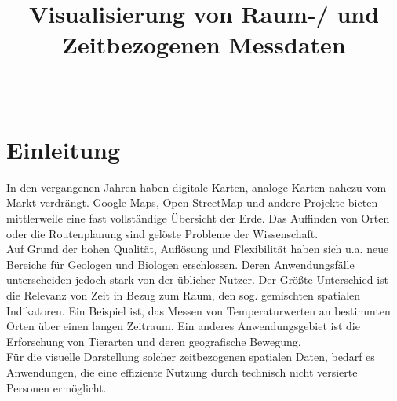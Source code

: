 \documentclass[10pt,conference,compsocconf]{IEEEtran}
\begin{document}
%
\title{\textbf{\Large Visualisierung von Raum-/ und Zeitbezogenen Messdaten}\\[0.2ex]}

\author{
\\
}

\maketitle

\IEEEpeerreviewmaketitle


\section{Einleitung}
In den vergangenen Jahren haben digitale Karten, analoge Karten nahezu vom Markt verdrängt. Google Maps, Open StreetMap und andere Projekte bieten mittlerweile eine fast vollständige Übersicht der Erde. Das Auffinden von Orten oder die Routenplanung sind gelöste Probleme der Wissenschaft.\\
Auf Grund der hohen Qualität, Auflösung und Flexibilität haben sich u.a. neue Bereiche für Geologen und Biologen erschlossen. Deren Anwendungsfälle unterscheiden jedoch stark von der üblicher Nutzer. Der Größte Unterschied ist die Relevanz von Zeit in Bezug zum Raum, den sog. gemischten spatialen Indikatoren. Ein Beispiel ist, das Messen von Temperaturwerten an bestimmten Orten über einen langen Zeitraum. Ein anderes Anwendungsgebiet ist die Erforschung von Tierarten und deren geografische Bewegung.\\
Für die visuelle Darstellung solcher zeitbezogenen spatialen Daten, bedarf es Anwendungen, die eine effiziente Nutzung durch technisch nicht versierte Personen ermöglicht.
\end{document}
